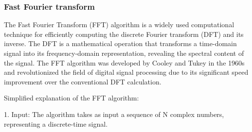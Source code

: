 \begin{table}
    \begin{center}
    \end{center}
    \caption{The output of facet analysis is a list of values for each facet. The accessible features are the facet size, the average strain, the average displacement, the facet center and the facet normal. The uncertainty on the average displacement and strain corresponds to the standard deviation of  the displacement and strain distribution, respectively.}
    \label{tab:facets}
\end{table}{}

\subsubsection{Fast Fourier transform} \label{sec:FFT}

The Fast Fourier Transform (FFT) algorithm is a widely used computational technique for efficiently computing the discrete Fourier transform (DFT) and its inverse.
The DFT is a mathematical operation that transforms a time-domain signal into its frequency-domain representation, revealing the spectral content of the signal.
The FFT algorithm was developed by Cooley and Tukey in the 1960s and revolutionized the field of digital signal processing due to its significant speed improvement over the conventional DFT calculation.

Simplified explanation of the FFT algorithm:

1. Input: The algorithm takes as input a sequence of N complex numbers, representing a discrete-time signal.

